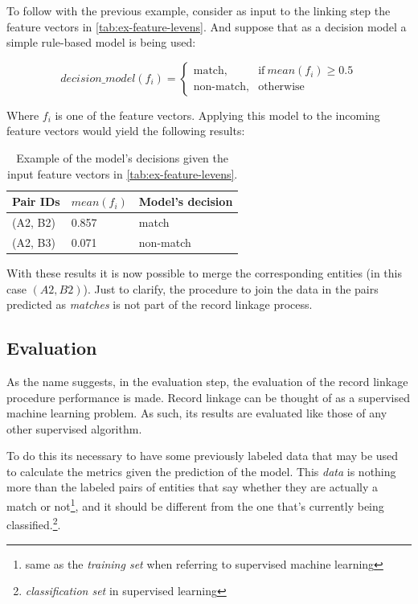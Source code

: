 \documentclass[epsfig,a4paper,11pt,titlepage,twoside,openany]{book}
\begin{document}
To follow with the previous example, consider as input to the linking step
the feature vectors in \autoref{tab:ex-feature-levens}. And suppose that as a
decision model a simple rule-based model is being used:

\begin{equation*}
  decision\_model(f_i) =
  \begin{cases}
    \text{match}, & \text{if}\ mean(f_i) \geq 0.5  \\
    \text{non-match}, & \text{otherwise}
  \end{cases}
\end{equation*}

Where $f_i$ is one of the feature vectors. Applying this model to the incoming
feature vectors would yield the following results:

\begin{table}[H]
  \centering
  \begin{tabular}{l|l|l}
    Pair IDs & $mean(f_i)$ & Model's decision \\ \hline
    (A2, B2) & 0.857       & match            \\
    (A2, B3) & 0.071       & non-match           
  \end{tabular}
  \caption{Example of the model's decisions given the input feature vectors in
    \autoref{tab:ex-feature-levens}.}
  \label{tab:ex-linking}
\end{table}

With these results it is now possible to merge the corresponding entities (in this case $(A2, B2)$). Just to clarify, the procedure to join the data in the pairs predicted as \textit{matches} is not part of the record linkage process.



\subsection{Evaluation}
\label{sec:rl-workflow-evaluation}

As the name suggests, in the evaluation step, the evaluation of the record linkage procedure performance is made. Record linkage can be thought of as a supervised machine learning problem. As such, its results are evaluated like those of any other supervised algorithm.

To do this its necessary to have some previously labeled data that may be used to calculate the metrics given the prediction of the model. This \textit{data} is nothing more than the labeled pairs of entities that say whether they are actually a match or not\footnote{same as the \textit{training set} when referring to supervised machine learning}, and it should be different from the one that’s currently being classified.\footnote{\textit{classification set} in supervised learning}.
\end{document}
